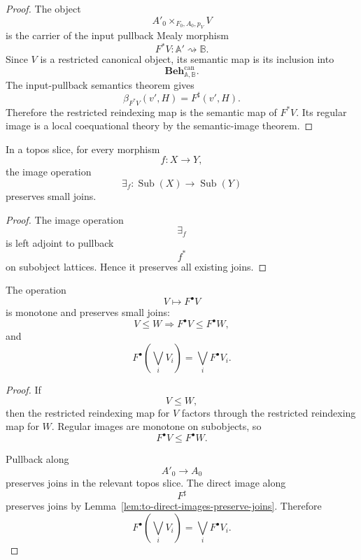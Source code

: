 \begin{proof}
    The object
    \[
        A'_0\times_{F_0,A_0,p_V}V
    \]
    is the carrier of the input pullback Mealy morphism
    \[
        F^*V:\mathbb A'\rightsquigarrow\mathbb B.
    \]
    Since \(V\) is a restricted canonical object, its semantic map is its
    inclusion into
    \[
        \mathbf{Beh}^{\mathrm{can}}_{\mathbb A,\mathbb B}.
    \]
    The input-pullback semantics theorem gives
    \[
        \beta_{F^*V}(v',H)=F^\sharp(v',H).
    \]
    Therefore the restricted reindexing map is the semantic map of \(F^*V\).
    Its regular image is a local coequational theory by the semantic-image
    theorem.
\end{proof}

\begin{lemma}
\label{lem:to-direct-images-preserve-joins}
    In a topos slice, for every morphism
    \[
        f:X\to Y,
    \]
    the image operation
    \[
        \exists_f:\operatorname{Sub}(X)\to\operatorname{Sub}(Y)
    \]
    preserves small joins.
\end{lemma}

\begin{proof}
    The image operation
    \[
        \exists_f
    \]
    is left adjoint to pullback
    \[
        f^*
    \]
    on subobject lattices. Hence it preserves all existing joins.
\end{proof}

\begin{lemma}
\label{lem:to-basic-properties-Fbullet}
    The operation
    \[
        V\longmapsto F^\bullet V
    \]
    is monotone and preserves small joins:
    \[
        V\leq W
        \Longrightarrow
        F^\bullet V\leq F^\bullet W,
    \]
    and
    \[
        F^\bullet\left(\bigvee_i V_i\right)
        =
        \bigvee_i F^\bullet V_i.
    \]
\end{lemma}

\begin{proof}
    If
    \[
        V\leq W,
    \]
    then the restricted reindexing map for \(V\) factors through the restricted
    reindexing map for \(W\). Regular images are monotone on subobjects, so
    \[
        F^\bullet V\leq F^\bullet W.
    \]

    Pullback along
    \[
        A'_0\to A_0
    \]
    preserves joins in the relevant topos slice. The direct image along
    \[
        F^\sharp
    \]
    preserves joins by Lemma~\ref{lem:to-direct-images-preserve-joins}.
    Therefore
    \[
        F^\bullet\left(\bigvee_i V_i\right)
        =
        \bigvee_i F^\bullet V_i.
    \]
\end{proof}

